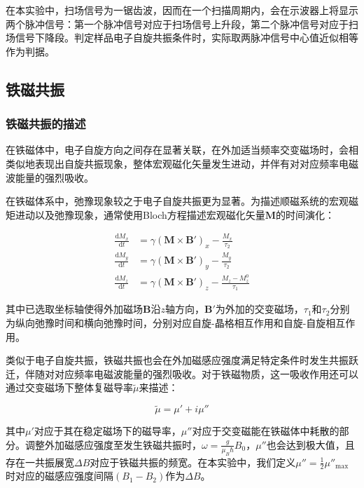\documentclass{thuemp}
\begin{document}
    在本实验中，扫场信号为一锯齿波，因而在一个扫描周期内，会在示波器上将显示两个脉冲信号：第一个脉冲信号对应于扫场信号上升段，第二个脉冲信号对应于扫场信号下降段。判定样品电子自旋共振条件时，实际取两脉冲信号中心值近似相等作为判据。
    
    \subsection{铁磁共振}
    
    \subsubsection{铁磁共振的描述}
    
    在铁磁体中，电子自旋方向之间存在显著关联，在外加适当频率交变磁场时，会相类似地表现出自旋共振现象，整体宏观磁化矢量发生进动，并伴有对对应频率电磁波能量的强烈吸收。
    
    在铁磁体系中，弛豫现象较之于电子自旋共振更为显著。为描述顺磁系统的宏观磁矩进动以及弛豫现象，通常使用Bloch方程描述宏观磁化矢量$\symbf{M}$的时间演化：
    
    \begin{equation}
    \begin{aligned}
        \frac{\mathrm{d} M_x}{\mathrm{d} t} &= \gamma (\symbf{M} \times \symbf{B'})_x - \frac{M_x}{\tau_2} \\
        \frac{\mathrm{d} M_y}{\mathrm{d} t} &= \gamma (\symbf{M} \times \symbf{B'})_y - \frac{M_y}{\tau_2} \\
        \frac{\mathrm{d} M_z}{\mathrm{d} t} &= \gamma (\symbf{M} \times \symbf{B'})_z - \frac{M_z - M_z^0}{\tau_1}
    \end{aligned}
    \end{equation}
    
    其中已选取坐标轴使得外加磁场$\mathbf{B}$沿$z$轴方向，$\symbf{B'}$为外加的交变磁场，$\tau_1$和$\tau_2$分别为纵向弛豫时间和横向弛豫时间，分别对应自旋-晶格相互作用和自旋-自旋相互作用。
    
    类似于电子自旋共振，铁磁共振也会在外加磁感应强度满足特定条件时发生共振跃迁，伴随对对应频率电磁波能量的强烈吸收。对于铁磁物质，这一吸收作用还可以通过交变磁场下整体复磁导率$\tilde\mu $来描述：
    
    \begin{equation}
        \tilde\mu = \mu' + i\mu''
    \end{equation}
    
    其中$\mu'$对应于其在稳定磁场下的磁导率，$\mu''$对应于交变磁能在铁磁体中耗散的部分。调整外加磁感应强度至发生铁磁共振时，$\omega = \frac{g}{\mu_B\hbar} B_0$，$\mu''$也会达到极大值，且存在一共振展宽$\Delta B$对应于铁磁共振的频宽。在本实验中，我们定义$\mu'' = \frac 1 2 \mu''_{\mathrm{max}}$时对应的磁感应强度间隔$(B_1 - B_2)$作为$\Delta B$。
    
\end{document}
